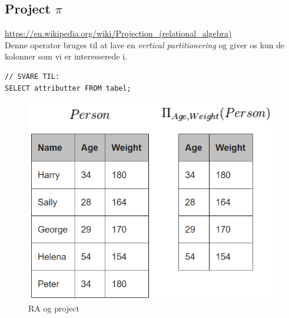 \subsection{Project $\pi$}

\url{https://en.wikipedia.org/wiki/Projection_(relational_algebra)}\\

Denne operator bruges til at lave en \textit{vertical partitionering} og giver os kun de kolonner som vi er interesserede i. 

\begin{lstlisting}[morekeywords={SELECT, FROM, WHERE}]
// SVARE TIL:
SELECT attributter FROM tabel;
\end{lstlisting}

\begin{figure}[h]
	\centering
	\includegraphics[width=0.6\linewidth]{figs/spm6/project}
	\caption{RA og project}
	\label{fig:project}
\end{figure}

%
%
%
